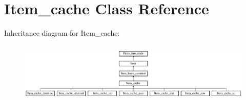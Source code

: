 \hypertarget{classItem__cache}{}\section{Item\+\_\+cache Class Reference}
\label{classItem__cache}
Inheritance diagram for Item\+\_\+cache\+:\begin{figure}[H]
\begin{center}
\leavevmode
\includegraphics[height=2.919708cm]{classItem__cache}
\end{center}
\end{figure}
